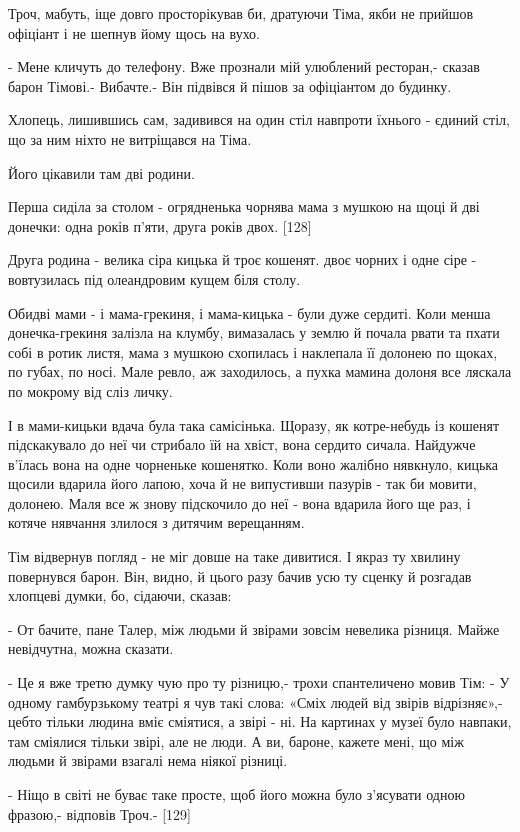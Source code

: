 Троч, мабуть, іще довго просторікував би, дратуючи Тіма, якби не прийшов офіціант і не шепнув йому щось на вухо.

- Мене кличуть до телефону. Вже прознали мій улюблений ресторан,- сказав барон Тімові.- Вибачте.- Він підвівся й пішов за офіціантом до будинку.

Хлопець, лишившись сам, задивився на один стіл навпроти їхнього - єдиний стіл, що за ним ніхто не витріщався на Тіма.

Його цікавили там дві родини.

Перша сиділа за столом - огрядненька чорнява мама з мушкою на щоці й дві донечки: одна років п'яти, друга років двох. [128]

Друга родина - велика сіра кицька й троє кошенят. двоє чорних і одне сіре - вовтузилась під олеандровим кущем біля столу.

Обидві мами - і мама-грекиня, і мама-кицька - були дуже сердиті. Коли менша донечка-грекиня залізла на клумбу, вимазалась у землю й почала рвати та пхати собі в ротик листя, мама з мушкою схопилась і наклепала її долонею по щоках, по губах, по носі. Мале ревло, аж заходилось, а пухка мамина долоня все ляскала по мокрому від сліз личку.

І в мами-кицьки вдача була така самісінька. Щоразу, як котре-небудь із кошенят підскакувало до неї чи стрибало їй на хвіст, вона сердито сичала. Найдужче в'їлась вона на одне чорненьке кошенятко. Коли воно жалібно нявкнуло, кицька щосили вдарила його лапою, хоча й не випустивши пазурів - так би мовити, долонею. Маля все ж знову підскочило до неї - вона вдарила його ще раз, і котяче нявчання злилося з дитячим верещанням.

Тім відвернув погляд - не міг довше на таке дивитися. І якраз ту хвилину повернувся барон. Він, видно, й цього разу бачив усю ту сценку й розгадав хлопцеві думки, бо, сідаючи, сказав:

- От бачите, пане Талер, між людьми й звірами зовсім невелика різниця. Майже невідчутна, можна сказати.

- Це я вже третю думку чую про ту різницю,- трохи спантеличено мовив Тім: - У одному гамбурзькому театрі я чув такі слова: «Сміх людей від звірів відрізняє»,- цебто тільки людина вміє сміятися, а звірі - ні. На картинах у музеї було навпаки, там сміялися тільки звірі, але не люди. А ви, бароне, кажете мені, що між людьми й звірами взагалі нема ніякої різниці.

- Ніщо в світі не буває таке просте, щоб його можна було з'ясувати одною фразою,- відповів Троч.- [129]

